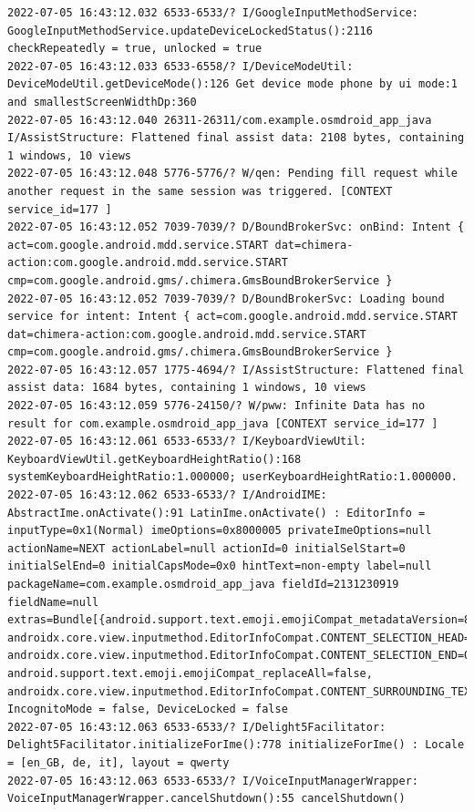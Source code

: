 \documentclass[a4paper,12pt]{book}
\begin{document}
\begin{lstlisting}
2022-07-05 16:43:12.032 6533-6533/? I/GoogleInputMethodService: GoogleInputMethodService.updateDeviceLockedStatus():2116 checkRepeatedly = true, unlocked = true
2022-07-05 16:43:12.033 6533-6558/? I/DeviceModeUtil: DeviceModeUtil.getDeviceMode():126 Get device mode phone by ui mode:1 and smallestScreenWidthDp:360
2022-07-05 16:43:12.040 26311-26311/com.example.osmdroid_app_java I/AssistStructure: Flattened final assist data: 2108 bytes, containing 1 windows, 10 views
2022-07-05 16:43:12.048 5776-5776/? W/qen: Pending fill request while another request in the same session was triggered. [CONTEXT service_id=177 ]
2022-07-05 16:43:12.052 7039-7039/? D/BoundBrokerSvc: onBind: Intent { act=com.google.android.mdd.service.START dat=chimera-action:com.google.android.mdd.service.START cmp=com.google.android.gms/.chimera.GmsBoundBrokerService }
2022-07-05 16:43:12.052 7039-7039/? D/BoundBrokerSvc: Loading bound service for intent: Intent { act=com.google.android.mdd.service.START dat=chimera-action:com.google.android.mdd.service.START cmp=com.google.android.gms/.chimera.GmsBoundBrokerService }
2022-07-05 16:43:12.057 1775-4694/? I/AssistStructure: Flattened final assist data: 1684 bytes, containing 1 windows, 10 views
2022-07-05 16:43:12.059 5776-24150/? W/pww: Infinite Data has no result for com.example.osmdroid_app_java [CONTEXT service_id=177 ]
2022-07-05 16:43:12.061 6533-6533/? I/KeyboardViewUtil: KeyboardViewUtil.getKeyboardHeightRatio():168 systemKeyboardHeightRatio:1.000000; userKeyboardHeightRatio:1.000000.
2022-07-05 16:43:12.062 6533-6533/? I/AndroidIME: AbstractIme.onActivate():91 LatinIme.onActivate() : EditorInfo = inputType=0x1(Normal) imeOptions=0x8000005 privateImeOptions=null actionName=NEXT actionLabel=null actionId=0 initialSelStart=0 initialSelEnd=0 initialCapsMode=0x0 hintText=non-empty label=null packageName=com.example.osmdroid_app_java fieldId=2131230919 fieldName=null extras=Bundle[{android.support.text.emoji.emojiCompat_metadataVersion=8, androidx.core.view.inputmethod.EditorInfoCompat.CONTENT_SELECTION_HEAD=0, androidx.core.view.inputmethod.EditorInfoCompat.CONTENT_SELECTION_END=0, android.support.text.emoji.emojiCompat_replaceAll=false, androidx.core.view.inputmethod.EditorInfoCompat.CONTENT_SURROUNDING_TEXT=}], IncognitoMode = false, DeviceLocked = false
2022-07-05 16:43:12.063 6533-6533/? I/Delight5Facilitator: Delight5Facilitator.initializeForIme():778 initializeForIme() : Locale = [en_GB, de, it], layout = qwerty
2022-07-05 16:43:12.063 6533-6533/? I/VoiceInputManagerWrapper: VoiceInputManagerWrapper.cancelShutdown():55 cancelShutdown()

\end{lstlisting}
\end{document}
